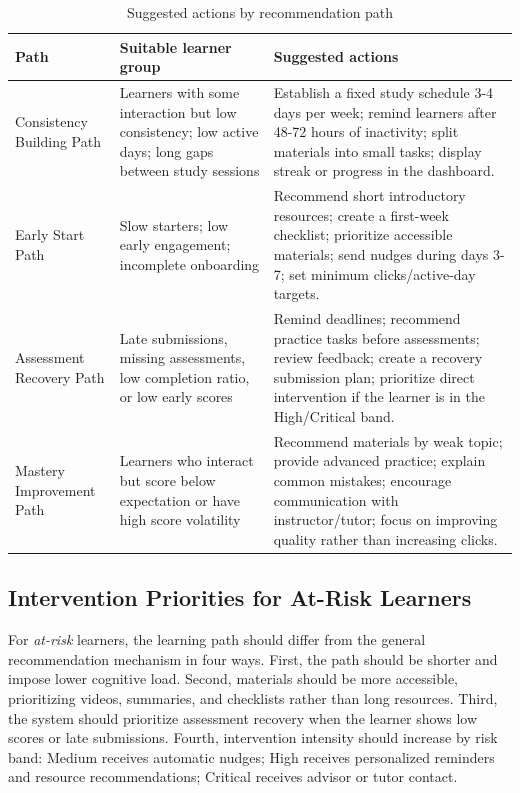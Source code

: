 \documentclass[conference]{IEEEtran}
\newcommand{\risk}{\textit{at-risk}}
\begin{document}
\begin{table}[t]
\centering
\footnotesize
\caption{Suggested actions by recommendation path}
\label{tab:actions}
\begin{tabularx}{\textwidth}{L{3.1cm}L{3.8cm}Y}
\toprule
Path & Suitable learner group & Suggested actions \\
\midrule
Consistency Building Path & Learners with some interaction but low consistency; low active days; long gaps between study sessions & Establish a fixed study schedule 3-4 days per week; remind learners after 48-72 hours of inactivity; split materials into small tasks; display streak or progress in the dashboard. \\
Early Start Path & Slow starters; low early engagement; incomplete onboarding & Recommend short introductory resources; create a first-week checklist; prioritize accessible materials; send nudges during days 3-7; set minimum clicks/active-day targets. \\
Assessment Recovery Path & Late submissions, missing assessments, low completion ratio, or low early scores & Remind deadlines; recommend practice tasks before assessments; review feedback; create a recovery submission plan; prioritize direct intervention if the learner is in the High/Critical band. \\
Mastery Improvement Path & Learners who interact but score below expectation or have high score volatility & Recommend materials by weak topic; provide advanced practice; explain common mistakes; encourage communication with instructor/tutor; focus on improving quality rather than increasing clicks. \\
\bottomrule
\end{tabularx}
\end{table}

\subsection{Intervention Priorities for At-Risk Learners}

For \risk{} learners, the learning path should differ from the general recommendation mechanism in four ways. First, the path should be shorter and impose lower cognitive load. Second, materials should be more accessible, prioritizing videos, summaries, and checklists rather than long resources. Third, the system should prioritize assessment recovery when the learner shows low scores or late submissions. Fourth, intervention intensity should increase by risk band: Medium receives automatic nudges; High receives personalized reminders and resource recommendations; Critical receives advisor or tutor contact.
\end{document}

